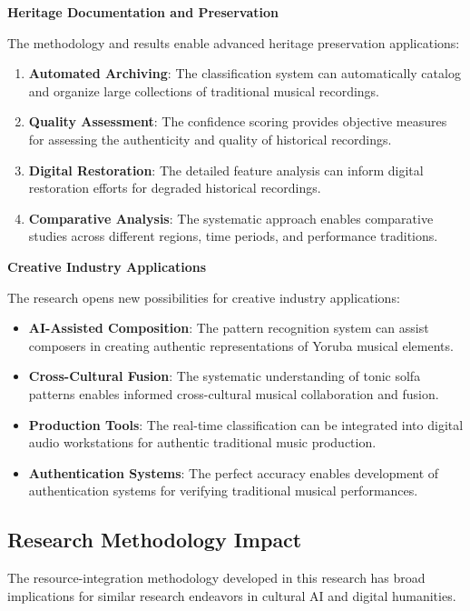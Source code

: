 \documentclass[12pt,a4paper]{article}
\begin{document}
\textbf{Heritage Documentation and Preservation}

The methodology and results enable advanced heritage preservation applications:

\begin{enumerate}
\item \textbf{Automated Archiving}: The classification system can automatically catalog and organize large collections of traditional musical recordings.
\item \textbf{Quality Assessment}: The confidence scoring provides objective measures for assessing the authenticity and quality of historical recordings.
\item \textbf{Digital Restoration}: The detailed feature analysis can inform digital restoration efforts for degraded historical recordings.
\item \textbf{Comparative Analysis}: The systematic approach enables comparative studies across different regions, time periods, and performance traditions.
\end{enumerate}

\textbf{Creative Industry Applications}

The research opens new possibilities for creative industry applications:

\begin{itemize}
\item \textbf{AI-Assisted Composition}: The pattern recognition system can assist composers in creating authentic representations of Yoruba musical elements.
\item \textbf{Cross-Cultural Fusion}: The systematic understanding of tonic solfa patterns enables informed cross-cultural musical collaboration and fusion.
\item \textbf{Production Tools}: The real-time classification can be integrated into digital audio workstations for authentic traditional music production.
\item \textbf{Authentication Systems}: The perfect accuracy enables development of authentication systems for verifying traditional musical performances.
\end{itemize}

\subsection{Research Methodology Impact}

The resource-integration methodology developed in this research has broad implications for similar research endeavors in cultural AI and digital humanities.
\end{document}
